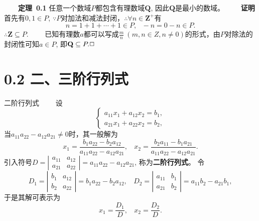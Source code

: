 \documentclass[compress,mathserif,cjk]{beamer}
\theoremstyle{remark}
\numberwithin{equation}{section}
\newcommand{\hei}{\bf}      %
\begin{document}
\begin{CJK}{UTF8}{gbsn}
\begin{frame}

 \ \ \ \ {\hei 定理~0.1} 任意一个数域$P$都包含有理数域$\mathbf Q$, 因此$\mathbf Q$是最小的数域。
 \pause\vskip10pt
  \ \ \ \ {\hei 证明} 首先有$0,1\in P$, $\because P$对加法和减法封闭，$\therefore\forall n\in\mathbf Z^+$有
  $$n=1+1+\cdots+1\in P,~~~-n=0-n\in P.$$
  $\therefore\mathbf Z\subseteq P$.
  \pause\vskip5pt
  \ \ \ \ 已知有理数$a$都可以写成$\frac{m}n~(m,n\in Z,n\neq0)$的形式，由$P$对除法的封闭性可知$a\in P$, 即$\mathbf Q\subseteq P.\hfill\Box$
\end{frame}

\section[0.2]{0.2 二、三阶行列式}
\begin{frame}{二阶行列式}
 \ \ \ \ 设
 $$\left\{\begin{array}{l}
 a_{11}x_1+a_{12}x_2=b_1,\\
 a_{21}x_1+a_{22}x_2=b_2,
 \end{array}\right.$$
 当$a_{11}a_{22}-a_{12}a_{21}\neq0$时，其一般解为
 $$x_1=\frac{b_1a_{22}-b_2a_{12}}{a_{11}a_{22}-a_{12}a_{21}},~~~~x_2=\frac{b_2a_{11}-b_1a_{21}}{a_{11}a_{22}-a_{12}a_{21}}.$$
 \pause
  引入符号$D=\left|\begin{matrix}a_{11}&a_{12}\\a_{21}&a_{22}\end{matrix}\right|=a_{11}a_{22}-a_{12}a_{21}$, 称为{\hei 二阶行列式}。 \pause 令
  $$D_1=\left|\begin{matrix}b_1&a_{12}\\b_2&a_{22}\end{matrix}\right|=b_1a_{22}-b_2a_{12},~~~~D_2=\left|\begin{matrix}a_{11}&b_1\\a_{21}&b_2\end{matrix}\right|=a_{11}b_2-a_{21}b_1,$$
  于是其解可表示为
  $$x_1=\frac{D_1}D,~~~~x_2=\frac{D_2}D.$$
\end{frame}


\end{CJK}
\end{document}
